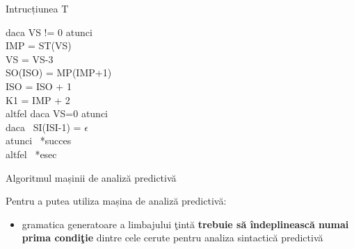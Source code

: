 \documentclass[pdf]{beamer}
\begin{document}
\begin{frame}{Intrucțiunea T}
\begin{tabbing}
daca VS != 0 atunci \\
\hspace*{1cm} IMP = ST(VS) \\
\hspace*{1cm} VS = VS-3 \\
\hspace*{1cm} SO(ISO) = MP(IMP+1) \\
\hspace*{1cm} ISO = ISO + 1 \\
\hspace*{1cm} K1 = IMP + 2 \\
altfel daca VS=0 atunci \\
\hspace*{1cm} daca \ SI(ISI-1) = $\epsilon $ \\
\hspace*{2cm} atunci \ *succes \\
\hspace*{1cm} altfel \ *esec \\
\end{tabbing}
\end{frame}



\begin{frame}{Algoritmul mașinii de analiză predictivă}

Pentru a putea utiliza mașina de analiză predictivă:

\begin{itemize}
\item
gramatica generatoare a limbajului ţintă \textbf{trebuie să îndeplinească numai prima condiţie} dintre cele cerute pentru analiza sintactică predictivă
\end{itemize}

\end{frame}
\end{document}
